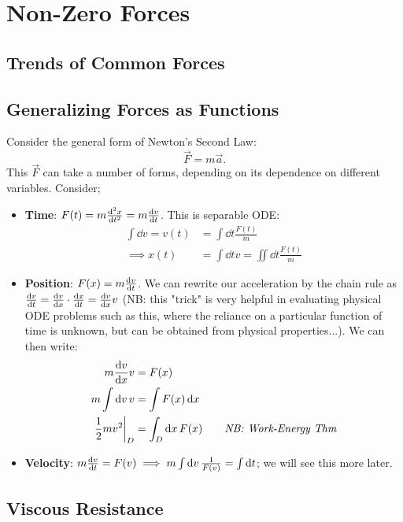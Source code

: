 \documentclass[12pt]{article}
\begin{document}
\section{Non-Zero Forces}


\subsection{Trends of Common Forces}

\subsection{Generalizing Forces as Functions}

Consider the general form of Newton's Second Law: \[\vec{F} = m \vec{a}.\]
This $\vec{F}$ can take a number of forms, depending on its dependence on different variables. Consider;
\begin{itemize}
  \item \textbf{Time}: $F(t) = m \dv[2]{x}{t} = m \dv{v}{t}$. This is separable ODE:
  \begin{align*}
    \int \dd{v} = v(t) &= \int \dd{t} \frac{F(t)}{m}\\
    \implies x(t) &= \int \dd{t} v = \iint \dd{t} \frac{F(t)}{m}
  \end{align*}
  \item \textbf{Position}: $F(x) = m \dv{v}{t}$. We can rewrite our acceleration by the chain rule as $\dv{v}{t} = \dv{v}{x}\cdot \dv{x}{t} = \dv{v}{x}v$ (NB: this "trick" is very helpful in evaluating physical ODE problems such as this, where the reliance on a particular function of time is unknown, but can be obtained  from physical properties...). We can then write:
  \begin{align*}
    m \dv{v}{x}v &= F(x)\\
    m \int \dd{v} v &= \int F(x) \dd{x}\\
    \eval{\frac{1}{2}mv^2}_{D} &= \int_{D} \dd{x} F(x) \qquad \textit{NB: Work-Energy Thm}
  \end{align*}
  \item \textbf{Velocity}: $m \dv{v}{t} = F(v) \implies m \int \dd{v} \frac{1}{F(v)} = \int \dd{t}$; we will see this more later.
\end{itemize}
\subsection{Viscous Resistance}
\end{document}
